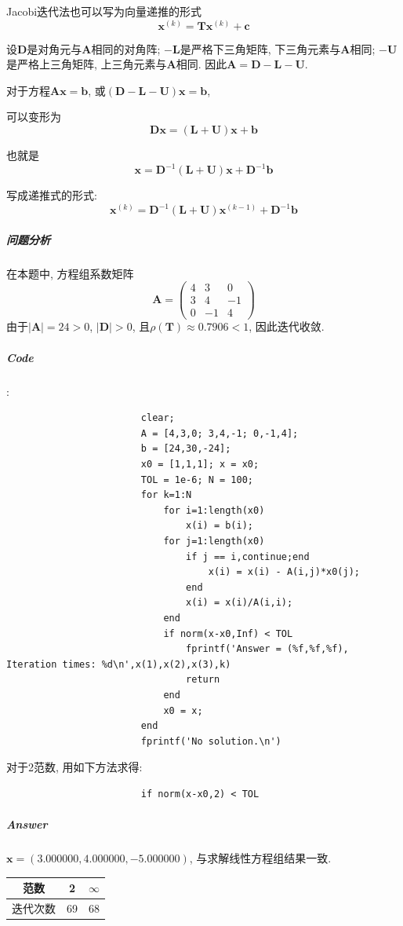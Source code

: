 \documentclass{article}
\begin{document}
\begin{CJK*}{UTF8}{song}
				Jacobi迭代法也可以写为向量递推的形式
				$$\mathbf{x}^{\left(k\right)} = \mathbf{T}\mathbf{x}^{\left(k\right)} + \mathbf{c}$$
				
				设$\mathbf{D}$是对角元与$\mathbf{A}$相同的对角阵; $-\mathbf{L}$是严格下三角矩阵, 下三角元素与$\mathbf{A}$相同; $-\mathbf{U}$是严格上三角矩阵, 上三角元素与$\mathbf{A}$相同. 因此$\mathbf{A} = \mathbf{D} - \mathbf{L} - \mathbf{U}$.
				
				对于方程$\mathbf{A} \mathbf{x} = \mathbf{b}$, 或$\left(\mathbf{D} - \mathbf{L} - \mathbf{U} \right) \mathbf{x} = \mathbf{b}$, 
				
				可以变形为$$\mathbf{D} \mathbf{x} = \left(\mathbf{L} + \mathbf{U} \right) \mathbf{x} + \mathbf{b}$$
				
				也就是$$\mathbf{x} = \mathbf{D}^{-1} \left(\mathbf{L} + \mathbf{U}\right) \mathbf{x} + \mathbf{D}^{-1}\mathbf{b}$$
				
				写成递推式的形式: $$\mathbf{x}^{\left(k\right)} = \mathbf{D}^{-1} \left(\mathbf{L} + \mathbf{U}\right) \mathbf{x}^{\left(k-1\right)} + \mathbf{D}^{-1}\mathbf{b}$$
				
				\subparagraph{问题分析}
				在本题中, 方程组系数矩阵
				$$\mathbf{A} = \left(
					\begin{matrix}
						4&3&0\\ 
						3&4&-1\\
						 0&-1&4
					\end{matrix}
				\right)$$
				由于$\left|\mathbf{A}\right| = 24 >0$, $\left|\mathbf{D} \right| > 0$, 且$\rho \left( \mathbf{T}\right) \approx 0.7906 < 1$, 因此迭代收敛.
				
				\subparagraph{Code}
				:\newline
					\begin{lstlisting}
						clear;
						A = [4,3,0; 3,4,-1; 0,-1,4];
						b = [24,30,-24];
						x0 = [1,1,1]; x = x0;
						TOL = 1e-6; N = 100;
						for k=1:N
							for i=1:length(x0)
								x(i) = b(i);
							for j=1:length(x0)
								if j == i,continue;end
									x(i) = x(i) - A(i,j)*x0(j);
								end
								x(i) = x(i)/A(i,i);
							end
							if norm(x-x0,Inf) < TOL
								fprintf('Answer = (%f,%f,%f), Iteration times: %d\n',x(1),x(2),x(3),k)
								return
							end
							x0 = x;
						end
						fprintf('No solution.\n')
					\end{lstlisting}
					对于2范数, 用如下方法求得:
					\begin{lstlisting}
						if norm(x-x0,2) < TOL
					\end{lstlisting}
				\subparagraph{Answer}
					$\mathbf{x} = \left(3.000000,4.000000,-5.000000\right)$, 与求解线性方程组结果一致.
					\begin{center}
						\begin{tabular}{|c|c|c|}
							\hline
							范数    & 2 & $\infty$ \\
							\hline
							迭代次数 & 69 & 68 \\
							\hline
						\end{tabular}
					\end{center}
					

\end{CJK*}
\end{document}
